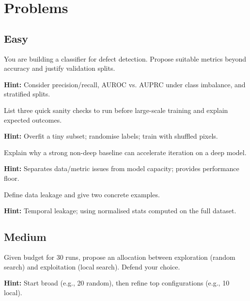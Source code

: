 
\section*{Problems}

\subsection*{Easy}

\begin{problem}
You are building a classifier for defect detection. Propose suitable metrics beyond accuracy and justify validation splits.

\textbf{Hint:} Consider precision/recall, AUROC vs. AUPRC under class imbalance, and stratified splits.
\end{problem}

\begin{problem}
List three quick sanity checks to run before large-scale training and explain expected outcomes.

\textbf{Hint:} Overfit a tiny subset; randomise labels; train with shuffled pixels.
\end{problem}

\begin{problem}
Explain why a strong non-deep baseline can accelerate iteration on a deep model.

\textbf{Hint:} Separates data/metric issues from model capacity; provides performance floor.
\end{problem}

\begin{problem}
Define data leakage and give two concrete examples.

\textbf{Hint:} Temporal leakage; using normalised stats computed on the full dataset.
\end{problem}

\subsection*{Medium}

\begin{problem}
Given budget for 30 runs, propose an allocation between exploration (random search) and exploitation (local search). Defend your choice.

\textbf{Hint:} Start broad (e.g., 20 random), then refine top configurations (e.g., 10 local).
\end{problem}

